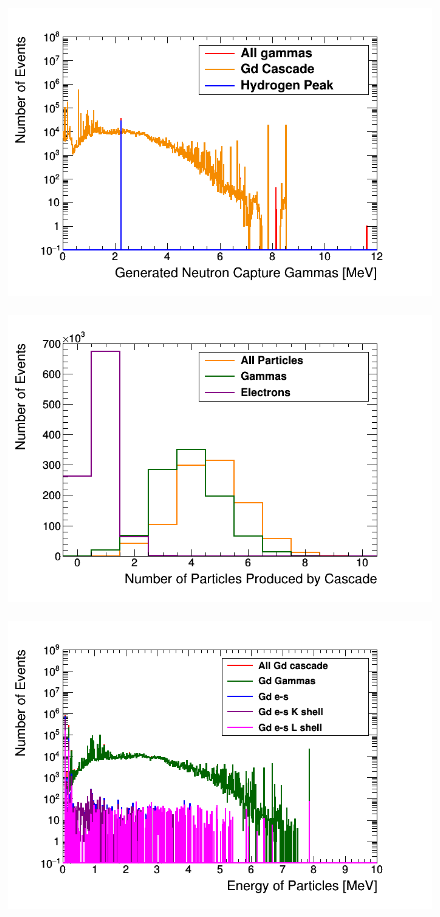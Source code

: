 \begin{figure}[H]
 \centering
 \includegraphics[width=0.7\linewidth]{Chapter4/Figs/Raster/gadolinium/gdCascadeVsAllGammas.png}
 \label{fig:gdCascadeVsAllGammas}
\end{figure}

\begin{figure}[H]
 \centering
 \includegraphics[width=0.7\linewidth]{Chapter4/Figs/Raster/gadolinium/gadoliniumMultipliciesBreakdownCascade.png}
 \label{fig:gadoliniumMultipliciesBreakdownCascade}
\end{figure}

\begin{figure}[H]
 \centering
 \includegraphics[width=0.7\linewidth]{Chapter4/Figs/Raster/gadolinium/gadoliniumEnergiesCascade.png}
 \label{fig:gadoliniumEnergiesCascade}
\end{figure}

